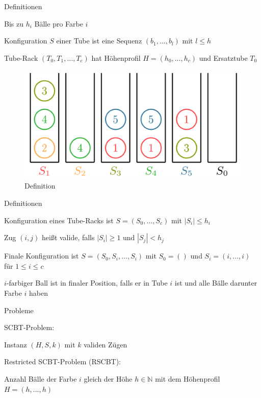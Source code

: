 \documentclass{beamer}
\begin{document}
		\begin{frame}{Definitionen}
	\begin{pointlist}
		\item Bis zu $h_i$ Bälle pro Farbe $i$
		\item Konfiguration $S$ einer Tube ist eine Sequenz $(b_1,\dots,b_l)$ mit $l\leq h$
		\item Tube-Rack $(T_0, T_1,\dots,T_c)$ hat Höhenprofil $H=(h_0,\dots,h_c)$ und Ersatztube $T_0$
		\end{pointlist}
		
\begin{figure}[ht]
		\includegraphics[width=.65\textwidth]{def}
		\caption{Definition}
    \end{figure}
		\end{frame}
		
		
\begin{frame}{Definitionen}
	\begin{pointlist}
		\item Konfiguration eines Tube-Racks ist $S=(S_0,\dots,S_c)$ mit $|S_i| \leq h_i$
		\item Zug $(i,j)$ heißt valide, falls $|S_i|\geq 1$ und $|S_j| < h_j$
		\item Finale Konfiguration ist $S=(S_0, S_i, \dots, S_i)$ mit $S_0 = ()$ und $S_i =(i,\dots,i)$ für $1\leq i \leq c$
		\item $i$-farbiger Ball ist in finaler Position, falls er in Tube $i$ ist und alle Bälle darunter Farbe $i$ haben
	\end{pointlist}
\end{frame}

\begin{frame}{Probleme}
	\begin{pointlist}
		\item SCBT-Problem:
		\begin{arrowlist}
 			\item Instanz $(H,S,k)$ mit $k$ validen Zügen
		\end{arrowlist}
		\item Restricted SCBT-Problem (RSCBT):
		\begin{arrowlist}
 			\item Anzahl Bälle der Farbe $i$ gleich der Höhe $h\in\mathbb{N}$ mit dem Höhenprofil $H=(h,\dots,h)$
		\end{arrowlist}
	\end{pointlist}
\end{frame}
\end{document}

